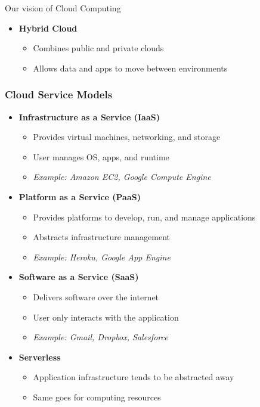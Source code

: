 \documentclass[10pt,aspectratio=1609]{beamer}
\begin{document}
\begin{section}{Our vision of Cloud Computing}
\begin{frame}
\begin{itemize}
    \item \textbf{Hybrid Cloud}
    \begin{itemize}
      \item Combines public and private clouds
      \item Allows data and apps to move between environments
    \end{itemize}
  \end{itemize}
\end{frame}

\begin{frame}
  \frametitle{Cloud Service Models}

  \begin{itemize}
    \item \textbf{Infrastructure as a Service (IaaS)}
    \begin{itemize}
      \item Provides virtual machines, networking, and storage
      \item User manages OS, apps, and runtime
      \item \emph{Example: Amazon EC2, Google Compute Engine}
    \end{itemize}

    \item \textbf{Platform as a Service (PaaS)}
    \begin{itemize}
      \item Provides platforms to develop, run, and manage applications
      \item Abstracts infrastructure management
      \item \emph{Example: Heroku, Google App Engine}
    \end{itemize}

    \item \textbf{Software as a Service (SaaS)}
    \begin{itemize}
      \item Delivers software over the internet
      \item User only interacts with the application
      \item \emph{Example: Gmail, Dropbox, Salesforce}
    \end{itemize}

    \item \textbf{Serverless}
    \begin{itemize}
      \item Application infrastructure tends to be abstracted away
      \item Same goes for computing resources
    \end{itemize}
  \end{itemize}
\end{frame}


\end{section}
\end{document}
